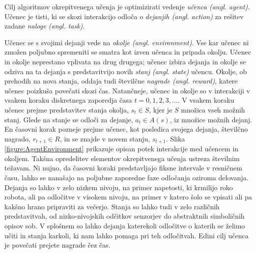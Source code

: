 \documentclass[a4paper, oneside, 12pt]{report}
\begin{document}

Cilj algoritmov okrepitvenega učenja je optimizirati vedenje {\em učenca (angl. agent)}. Učenec je tisti, ki se skozi interakcijo odloča o {\em dejanjih (angl. action)} za rešitev zadane {\em naloge (angl. task)}.

Učenec se s svojimi dejanji vede na {\em okolje (angl. environment)}. Vse kar učenec ni zmožen poljubno spremeniti se smatra kot izven učenca in pripada okolju. Učenec in okolje neprestano vplivata na drug drugega; učenec izbira dejanja in okolje se odziva na ta dejanja s predstavitvijo novih {\em stanj (angl. state)} učencu. Okolje, ob prehodih na nova stanja, oddaja tudi številčne {\em nagrade (angl. reward)}, katere učenec poizkuša povečati skozi čas. Natančneje, učenec in okolje so v interakciji v vsakem koraku diskretnega zaporedja časa $t = 0, 1, 2, 3, \dots$. V vsakem koraku učenec prejme predstavitev stanja okolja, $s_t \in S$, kjer je $S$ množica vseh možnih stanj. Glede na stanje se odloči za dejanje, $a_t \in A(s)$, iz množice možnih dejanj. En časovni korak pozneje prejme učenec, kot posledica svojega dejanja, številčno nagrado, $r_{t+1} \in R$, in se znajde v novem stanju, $s_{t+1}$. Slika \ref{figure:AgentEnvironment} prikazuje opisan potek interakcije med učencem in okoljem. Takšna opredelitev elementov okrepitvenega učenja ustreza številnim težavam. Ni nujno, da časovni koraki predstavljajo fiksne intervale v resničnem času, lahko se nanašajo na poljubne zaporedne faze odločanja oziroma delovanja. Dejanja so lahko v zelo nizkem nivoju, na primer napetosti, ki krmilijo roko robota, ali pa odločitve v visokem nivoju, na primer v katero šolo se vpisati ali pa kakšno hrano pripraviti za večerjo. Stanja so lahko tudi v zelo različnih predstavitvah, od nizko-nivojskih odčitkov senzorjev do abstraktnih simboličnih opisov sob. V splošnem so lahko dejanja katerekoli odločitve o katerih se želimo učiti in stanja karkoli, ki nam lahko pomaga pri teh odločitvah. Edini cilj učenca je povečati prejete nagrade čez čas.
\end{document}
